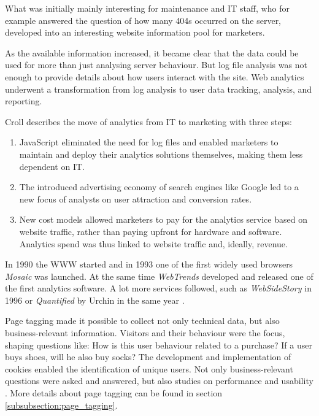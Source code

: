What was initially mainly interesting for maintenance and IT staff, who for example answered the question of how many 404s occurred on the server, developed into an interesting website information pool for marketers.

As the available information increased, it became clear that the data could be used for more than just analysing server behaviour.
But log file analysis was not enough to provide details about how users interact with the site.
Web analytics underwent a transformation from log analysis to user data tracking, analysis, and reporting.

Croll \cite{2009Croll} describes the move of analytics from IT to marketing with three steps:

\begin{enumerate}
\item JavaScript eliminated the need for log files and enabled marketers to maintain and deploy their analytics solutions themselves, making them less dependent on IT.
\item The introduced advertising economy of search engines like Google led to a new focus of analysts on user attraction and conversion rates.
\item New cost models allowed marketers to pay for the analytics service based on website traffic, rather than paying upfront for hardware and software. Analytics spend was thus linked to website traffic and, ideally, revenue.
\end{enumerate}


In 1990 the WWW started and in 1993 one of the first widely used browsers \textit{Mosaic} was launched.
At the same time \textit{WebTrends} developed and released one of the first analytics software.
A lot more services followed, such as \textit{WebSideStory} in 1996 \cite{2009Croll}
or \textit{Quantified} by Urchin in the same year \cite{2009Croll}.

Page tagging made it possible to collect not only technical data, but also business-relevant information.
Visitors and their behaviour were the focus, shaping questions like: How is this user behaviour related to a purchase? If a user buys shoes, will he also buy socks?
The development and implementation of cookies enabled the identification of unique users.
Not only business-relevant questions were asked and answered, but also studies on performance and usability \cite{2009Croll}. %
More details about page tagging can be found in section \ref{subsubsection:page_tagging}.
\\

